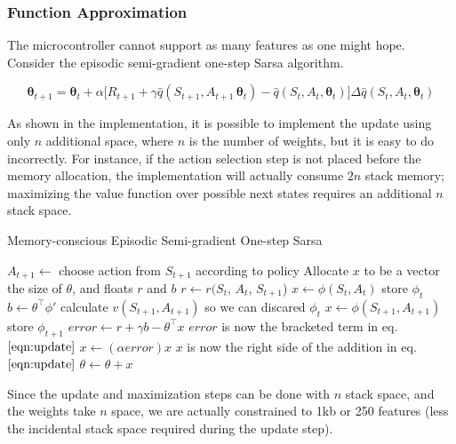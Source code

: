 \documentclass{article}
\begin{document}
	\subsubsection{Function Approximation}
	
	The microcontroller cannot support as many features as one might hope. Consider the episodic semi-gradient one-step Sarsa algorithm.
	
	\begin{equation}\label{eqn:update}
	\bm{\theta}_{t+1} = \bm{\theta}_t + \alpha \Big[R_{t+1} + \gamma \hat{q}(S_{t+1}, A_{t+1}\, \bm{\theta}_t) - \hat{q}(S_t, A_t, \bm{\theta}_t)\Big]\Delta\hat{q}(S_t, A_t, \bm{\theta}_t)\tag{1}
	\end{equation}

	As shown in the implementation, it is possible to implement the update using only $n$ additional space, where $n$ is the number of weights, but it is easy to do incorrectly. For instance, if the action selection step is not placed before the memory allocation, the implementation will actually consume $2n$ stack memory; maximizing the value function over possible next states requires an additional $n$ stack space.
	
		\begin{algorithm}
			\caption{Memory-conscious Episodic Semi-gradient One-step Sarsa}
			\label{alg:update}
			\begin{algorithmic}[1] %
				\State $A_{t+1} \gets $ choose action from $S_{t+1}$ according to policy
				\State Allocate $x$ to be a vector the size of $\theta$, and floats $r$ and $b$
				\State $r\gets r(S_t$, $A_t$, $S_{t+1}$)
				\State $x \gets \phi(S_t, A_t)$ \Comment store $\phi_{t}$
				\State $b \gets \theta^\top \phi'$ \Comment calculate $v(S_{t+1},A_{t+1})$ so we can discared $\phi_{t}$
				\State $x \gets \phi(S_{t+1}, A_{t+1})$ \Comment store $\phi_{t+1}$
				\State $error \gets r + \gamma b - \theta^\top x$ \Comment $error$ is now the bracketed term in eq. $\ref{eqn:update}$
				\State $x \gets (\alpha error)x$ \Comment $x$ is now the right side of the addition in eq. $\ref{eqn:update}$
				\State $\theta \gets \theta + x$
				\
				\EndProcedure
			\end{algorithmic}
		\end{algorithm}
	
	Since the update and maximization steps can be done with $n$ stack space, and the weights take $n$ space, we are actually constrained to 1kb or 250 features (less the incidental stack space required during the update step).
	
\end{document}
